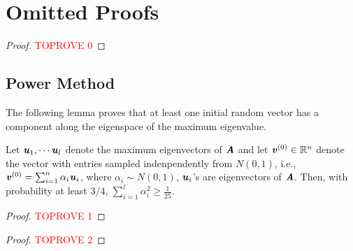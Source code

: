 
\section{Omitted Proofs}
\Decision*
\begin{proof}\textcolor{red}{TOPROVE 0}\end{proof}

\subsection*{Power Method}

The following lemma proves that at least one initial random vector has a component along the eigenspace of the maximum eigenvalue.
\begin{lemma}\label{lem:PMHighComp}
Let $\uu_1,\cdots \uu_l$ denote the maximum eigenvectors of $\AA$ and let $\vv^{(0)} \in \mathbb{R}^n$ denote the vector with entries sampled indenpendently from $N(0,1)$, i.e., $\vv^{(0)} = \sum_{i=1}^n\alpha_i\uu_i$, where $\alpha_i \sim N(0,1)$, $\uu_i$'s are eigenvectors of $\AA$. Then, with probability at least $3/4$, $\sum_{i=1}^l\alpha_i^2 \geq \frac{1}{25}$.
\end{lemma}
\begin{proof}\textcolor{red}{TOPROVE 1}\end{proof}

\PowerMethod*
\begin{proof}\textcolor{red}{TOPROVE 2}\end{proof}

